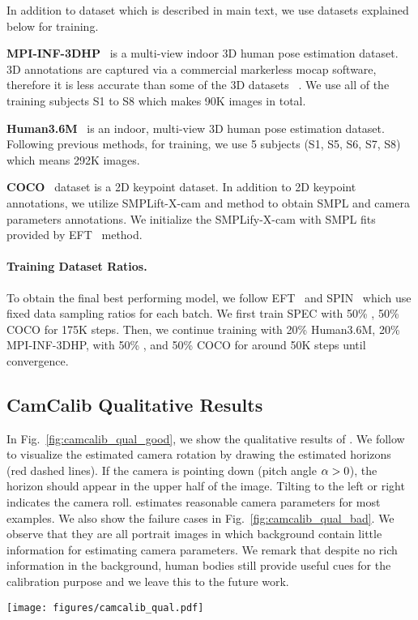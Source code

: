 \documentclass[10pt,twocolumn,letterpaper,usenames,dvipsnames]{article}
\begin{document}
In addition to \agoracam dataset which is described in main text, we use datasets explained below for training.

\noindent\textbf{MPI-INF-3DHP}~\cite{mpiiinf3dhp_mono-2017} is a multi-view indoor 3D human pose estimation dataset. 3D annotations are captured via a commercial markerless mocap software, therefore it is less accurate than some of the 3D datasets \eg \hthreesixm~\cite{ionescu_h36m}. We use all of the training subjects S1 to S8 which makes 90K images in total.

\noindent\textbf{Human3.6M}~\cite{ionescu_h36m} is an indoor, multi-view 3D human pose estimation dataset. Following previous methods, for training, we use 5 subjects (S1, S5, S6, S7, S8) which means 292K images.

\noindent\textbf{COCO}~\cite{coco} dataset is a 2D keypoint dataset. In addition to 2D keypoint annotations, we utilize SMPLift-X-cam and \camcalib method to obtain SMPL and camera parameters annotations. We initialize the SMPLify-X-cam with SMPL fits provided by EFT~\cite{joo2020eft} method.

\paragraph{Training Dataset Ratios.}
To obtain the final best performing model, we follow EFT~\cite{joo2020eft} and SPIN~\cite{SPIN:ICCV:2019} which use fixed data sampling ratios for each batch. We first train SPEC with 50\% \agoracam, 50\% COCO for 175K steps. Then, we continue training 
with 20\% Human3.6M, 20\% MPI-INF-3DHP, with 50\% \agoracam, and 50\% COCO for around 50K steps until convergence.

\subsection{CamCalib Qualitative Results}
In Fig.~\ref{fig:camcalib_qual_good}, we show the qualitative results of \camcalib. 
We follow \cite{zhu2020single} to visualize the estimated camera rotation by drawing the estimated horizons (red dashed lines). 
If the camera is pointing down (pitch angle $\alpha > 0$), the horizon should appear in the upper half of the image. 
Tilting to the left or right indicates the camera roll.
\camcalib estimates reasonable camera parameters for most examples.
We also show the failure cases in Fig.~\ref{fig:camcalib_qual_bad}.
We observe that they are all portrait images in which background contain little information for estimating camera parameters.
We remark that despite no rich information in the background, human bodies still provide useful cues for the calibration purpose and we leave this to the future work.
\begin{figure*}
    \centering
    \texttt{[image: figures/camcalib\_qual.pdf]}
    \caption{\textbf{\camcalib qualitative results.}}
    \label{fig:camcalib_qual_good}
\end{figure*}
\end{document}
